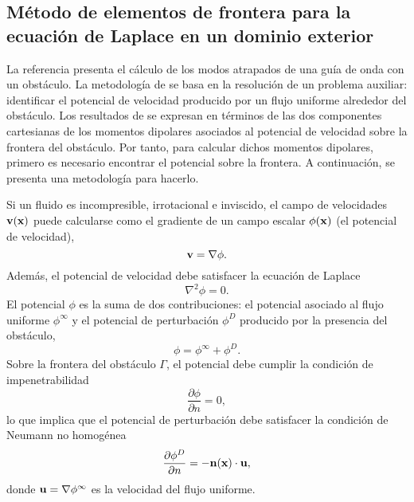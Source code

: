 \documentclass[11pt]{article}
\begin{document}
\subsection{Método de elementos de frontera para la ecuación de Laplace en un dominio exterior}
La referencia \cite{zhevandrov2025discrete} presenta el cálculo de los modos atrapados de una guía de onda con un obstáculo. La metodología de \cite{zhevandrov2025discrete} se basa en la resolución de un problema auxiliar: identificar el potencial de velocidad producido por un flujo uniforme alrededor del obstáculo. Los resultados de \cite{zhevandrov2025discrete} se expresan en términos de las dos componentes cartesianas de los momentos dipolares asociados al potencial de velocidad sobre la frontera del obstáculo. Por tanto, para calcular dichos momentos dipolares, primero es necesario encontrar el potencial sobre la frontera. A continuación, se presenta una metodología para hacerlo.

Si un fluido es incompresible, irrotacional e inviscido, el campo de velocidades ${\bf v}({\bf x})$ puede calcularse como el gradiente de un campo escalar $\phi({\bf x})$ (el potencial de velocidad),
\begin{equation}
  \label{eq:1}
  {\bf v} = \nabla\phi.
\end{equation}
Además, el potencial de velocidad debe satisfacer la ecuación de Laplace
\begin{equation}
  \label{eq:2}
  \nabla^2\phi = 0.
\end{equation}
El potencial $\phi$ es la suma de dos contribuciones:
el potencial asociado al flujo uniforme $\phi^\infty$  y el potencial de perturbación $\phi^D$ producido por la presencia del obstáculo,
\begin{equation}
  \label{eq:3}
  \phi = \phi^\infty + \phi^D.
\end{equation}
Sobre la frontera del obstáculo $\Gamma$, el potencial debe cumplir la condición de impenetrabilidad
\begin{equation}
  \label{eq:4}
  \frac{\partial\phi}{\partial n} = 0,
\end{equation}
lo que implica que el potencial de perturbación debe satisfacer la condición de Neumann no homogénea
\begin{equation}
  \label{eq:5}
  \frac{\partial\phi^D}{\partial n} = -\mathbf{n}(\mathbf{x})\cdot{\bf u},
\end{equation}
donde ${\bf u} = \nabla\phi^\infty$ es la velocidad del flujo uniforme.
\end{document}
